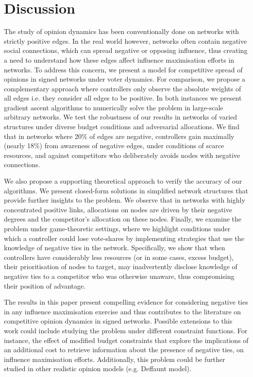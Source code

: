 \section{Discussion}
\label{Summary}
The study of opinion dynamics has been conventionally done on networks with strictly positive edges. In the real world however, networks often contain negative social connections, which can spread negative or opposing influence, thus creating a need to understand how these edges affect influence maximisation efforts in networks. 
To address this concern, we present a model for competitive spread of opinions in signed networks under voter dynamics. For comparison, we propose a complementary approach where controllers only observe the absolute weights of all edges i.e. they consider all edges to be positive. In both instances we present gradient ascent algorithms to numerically solve the problem in large-scale arbitrary networks. We test the robustness of our results in networks of varied structures under diverse budget conditions and adversarial allocations. 
We find that in networks where 20\% of edges are negative, controllers gain maximally (nearly 18\%) from awareness of negative edges, under conditions of scarce resources, and against competitors who deliberately avoids nodes with negative connections. 

We also propose a supporting theoretical approach to verify the accuracy of our algorithms. We present closed-form solutions in simplified network structures that provide further insights to the problem. We observe that in networks with highly concentrated positive links, allocations on nodes are driven by their negative degrees and the competitor's allocation on these nodes. Finally, we examine the problem under game-theoretic settings, where we highlight conditions under which a controller could lose vote-shares by implementing strategies that use the knowledge of negative ties in the network. Specifically, we show that when controllers have considerably less resources (or in some cases, excess budget), their prioritisation of nodes to target, may inadvertently disclose knowledge of negative ties to a competitor who was otherwise unaware, thus compromising their position of advantage.

The results in this paper present compelling evidence for considering negative ties in any influence maximisation exercise and thus contributes to the literature on competitive opinion dynamics in signed networks. Possible extensions to this work could include studying the problem under different constraint functions. For instance, the effect of modified budget constraints that explore the implications of an additional cost to retrieve information about the presence of negative ties, on influence maximisation efforts.
Additionally, this problem could be further studied in other realistic opinion models (e.g. Deffaunt model). 



